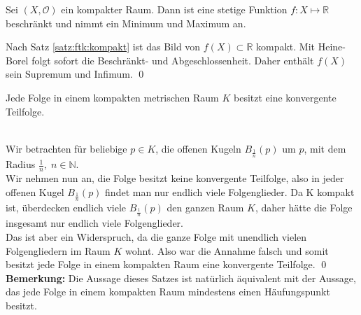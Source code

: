 \begin{Satz}
	Sei \((X, \mathcal{O})\) ein kompakter Raum. Dann ist eine stetige Funktion \(f: X \mapsto \mathbb{R}\) 
	beschränkt und nimmt ein Minimum und Maximum an.
\end{Satz}
%
	Nach Satz \ref{satz:ftk:kompakt} ist das Bild von \( f(X) \subset \mathbb{R} \) kompakt. Mit Heine-Borel 
	folgt sofort die Beschränkt- und Abgeschlossenheit. Daher enthält \(f(X)\) sein Supremum und Infimum.
\qed
	\begin{Satz}
		Jede Folge in einem kompakten metrischen Raum \(K\) besitzt eine konvergente Teilfolge.
	\end{Satz}
	\\
		Wir betrachten für beliebige \( p \in K \), die offenen Kugeln \( B_{\frac{1}{n}}(p) \) um \(p \), mit dem Radius \( \frac{1}{n},\; n \in \mathbb{N}\). \\
		Wir nehmen nun an, die Folge besitzt keine konvergente Teilfolge, also in jeder offenen Kugel \( B_{\frac{1}{n}}(p) \) findet man nur endlich viele Folgenglieder. 
		Da K kompakt ist, überdecken endlich viele  \( B_{\frac{1}{n}}(p) \) den ganzen Raum \( K \), daher hätte die Folge insgesamt nur endlich viele Folgenglieder.\\
		Das ist aber ein Widerspruch, da die ganze Folge mit unendlich vielen Folgengliedern im Raum \(K \) wohnt. Also war die Annahme falsch und somit besitzt jede Folge in einem kompakten
		Raum eine konvergente Teilfolge.
	\qed\\
	{\bf Bemerkung:} Die Aussage dieses Satzes ist natürlich äquivalent mit der Aussage, das jede Folge in einem kompakten Raum mindestens einen Häufungspunkt besitzt. 
	

